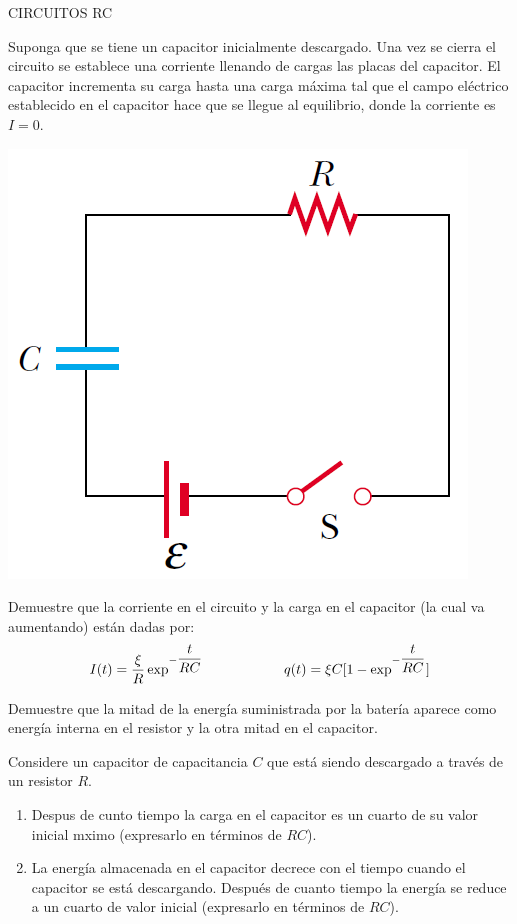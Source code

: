 \documentclass[12pt]{article}
\begin{document}
\begin{enumerate}
\vspace{1.0 cm}
CIRCUITOS RC\\

\begin{minipage}{11 cm}{
\item Suponga que se tiene un capacitor inicialmente descargado. Una vez se cierra el circuito se establece una corriente llenando de cargas las placas del capacitor. El capacitor incrementa su carga hasta una carga máxima tal que el campo eléctrico establecido en el capacitor hace que se llegue al equilibrio, donde la corriente es $I=0$.}
\end{minipage}
\begin{minipage}{5 cm}{
\includegraphics[scale=0.3]{grafica6}
}
\end{minipage}  

Demuestre que la corriente en el circuito y la carga en el capacitor (la cual va aumentando) están dadas por:
\begin{displaymath}
I(t)=\dfrac{\xi}{R}\exp^{-\dfrac{t}{RC}} \hspace{2 cm}
q(t)=\xi C[1-\exp^{-\dfrac{t}{RC}}]
\end{displaymath}

\item Demuestre que la mitad de la energía suministrada por la batería aparece como energía interna en el resistor y la otra mitad en el capacitor.

\item Considere un capacitor de capacitancia $C$ que está siendo descargado a través de un resistor $R$.
\begin{enumerate}
\item Despus de cunto tiempo la carga en el capacitor es un cuarto de su valor inicial mximo (expresarlo en términos de $RC$).
\item La energía almacenada en el capacitor decrece con el tiempo cuando el capacitor se está descargando. Después de cuanto tiempo la energía se reduce a un cuarto de valor inicial (expresarlo en términos de $RC$).
\end{enumerate}


\end{enumerate}
\end{document}
